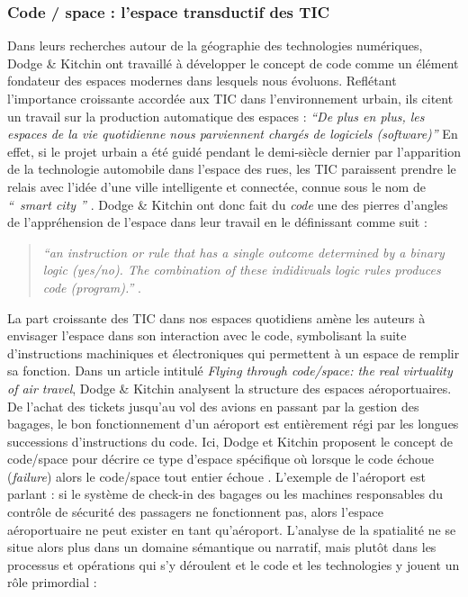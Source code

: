 \subsubsection[Code / space : l’espace transductif des TIC]{Code / space : l’espace transductif des TIC}

Dans leurs recherches autour de la géographie des technologies numériques, Dodge \& Kitchin ont travaillé à développer le concept de code comme un élément fondateur des espaces modernes dans lesquels nous évoluons. Reflétant l’importance croissante accordée aux TIC dans l’environnement urbain, ils citent un travail sur la production automatique des espaces : \textit{“De plus en plus, les espaces de la vie  quotidienne nous parviennent chargés de logiciels (software)”} \citep{Thrift2002} En effet, si le projet urbain a été guidé pendant le demi-siècle dernier par l’apparition de la technologie automobile dans l’espace des rues, les TIC paraissent prendre le relais avec l’idée d’une ville intelligente et connectée, connue sous le nom de \textit{`` smart city ''} \citep{Ascher2009,Picon2014}. Dodge \& Kitchin ont donc fait du \textit{code} une des pierres d’angles de l’appréhension de l’espace dans leur travail en le définissant comme suit : 

\begin{quote}
\textit{``an instruction or rule that has a single outcome determined by a binary logic (yes/no). The combination of these indidivuals logic rules produces code (program).''} \citep{Kitchin2011}.
\end{quote}

La part croissante des TIC dans nos espaces quotidiens amène les auteurs à envisager l’espace dans son interaction avec le code, symbolisant la suite d’instructions machiniques et électroniques qui permettent à un espace de remplir sa fonction. Dans un article intitulé \textit{Flying through code/space: the real virtuality of air travel}, Dodge \& Kitchin analysent la structure des espaces aéroportuaires. De l’achat des tickets jusqu’au vol des avions en passant par la gestion des bagages, le bon fonctionnement d’un aéroport est entièrement régi par les longues successions d’instructions du code. Ici, Dodge et Kitchin proposent le concept de code/space pour décrire ce type d’espace spécifique où lorsque le code échoue (\textit{failure}) alors le code/space tout entier échoue \citep{Dodge2004}. L’exemple de l’aéroport est parlant : si le système de check-in des bagages ou les machines responsables du contrôle de sécurité des passagers ne fonctionnent pas, alors l’espace aéroportuaire ne peut exister en tant qu’aéroport. L’analyse de la spatialité ne se situe alors plus dans un domaine sémantique ou narratif, mais plutôt dans les processus et opérations qui s’y déroulent et le code et les technologies y jouent un rôle primordial : 

